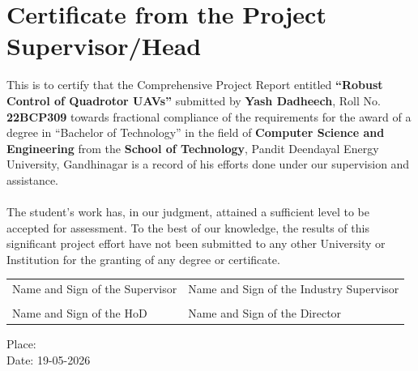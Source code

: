 \chapter*{\center \Large  Certificate from the Project Supervisor/Head}

This is to certify that the Comprehensive Project Report entitled \textbf{``Robust Control of Quadrotor UAVs''} submitted by \textbf{Yash Dadheech}, Roll No. \textbf{22BCP309} towards fractional compliance of the requirements for the award of a degree in ``Bachelor of Technology'' in the field of \textbf{Computer Science and Engineering} from the \textbf{School of Technology}, Pandit Deendayal Energy University, Gandhinagar is a record of his efforts done under our supervision and assistance. \\
\\
The student's work has, in our judgment, attained a sufficient level to be accepted for assessment. To the best of our knowledge, the results of this significant project effort have not been submitted to any other University or Institution for the granting of any degree or certificate.

\vspace{3cm}

\begin{tabular}{p{7cm} p{7cm}}
Name and Sign of the Supervisor & Name and Sign of the Industry Supervisor \\
\\[2cm]
Name and Sign of the HoD & Name and Sign of the Director \\
\end{tabular}

\vspace{2cm}

Place: \\[1cm]
Date: 19-05-2026